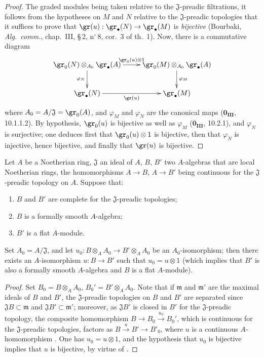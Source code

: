 \begin{proof}
The graded modules being taken relative to the $\mathfrak{J}$-preadic filtrations, it follows from the hypotheses on $M$ and $N$ relative to the $\mathfrak{J}$-preadic topologies that it suffices to prove that $\gr(u):\gr_\bullet(N)\to\gr_\bullet(M)$ is \emph{bijective} (Bourbaki, \emph{Alg.\ comm.}, chap.~III, \S\,2, n$^\circ$\,8, cor.~3 of th.~1).
Now, there is a commutative diagram
\[
\xymatrix{
  \gr_0(N)\otimes_{A_0}\gr_\bullet(A) \ar[r]^-{\gr_0(u)\otimes 1} \ar[d]_{\varphi_N} & \gr_0(M)\otimes_{A_0}\gr_\bullet(A) \ar[d]^{\varphi_M} \\
  \gr_\bullet(N) \ar[r]_-{\gr(u)} & \gr_\bullet(M)
}
\]
where $A_0=A/\mathfrak{J}=\gr_0(A)$, and $\varphi_M$ and $\varphi_N$ are the canonical maps ($\mathbf{0_{III}}$, 10.1.1.2).
By hypothesis, $\gr_0(u)$ is bijective as well as $\varphi_M$ ($\mathbf{0_{III}}$, 10.2.1), and $\varphi_N$ is surjective; one deduces first that $\gr_0(u)\otimes 1$ is bijective, then that $\varphi_N$ is injective, hence bijective, and finally that $\gr(u)$ is bijective.
\end{proof}

\begin{lemma}[19.7.1.5]
\label{0.19.7.1.5}
Let $A$ be a Noetherian ring, $\mathfrak{J}$ an ideal of $A$, $B$, $B'$ two $A$-algebras that are local Noetherian rings, the homomorphisms $A\to B$, $A\to B'$ being continuous for the $\mathfrak{J}$-preadic topology on $A$.
Suppose that:
\begin{enumerate}
  \item[$1^\circ$] $B$ and $B'$ are complete for the $\mathfrak{J}$-preadic topologies;
  \item[$2^\circ$] $B$ is a formally smooth $A$-algebra;
  \item[$3^\circ$] $B'$ is a flat $A$-module.
\end{enumerate}
Set $A_0=A/\mathfrak{J}$, and let $u_0:B\otimes_A A_0\to B'\otimes_A A_0$ be an $A_0$-isomorphism; then there exists an $A$-isomorphism $u:B\to B'$ such that $u_0=u\otimes 1$ (which implies that $B'$ is also a formally smooth $A$-algebra and $B$ is a flat $A$-module).
\end{lemma}

\begin{proof}
Set $B_0=B\otimes_A A_0$, $B_0'=B'\otimes_A A_0$.
Note that if $\mathfrak{m}$ and $\mathfrak{m}'$ are the maximal ideals of $B$ and $B'$, the $\mathfrak{J}$-preadic topologies on $B$ and $B'$ are separated since $\mathfrak{J}B\subset\mathfrak{m}$ and $\mathfrak{J}B'\subset\mathfrak{m}'$; moreover, as $\mathfrak{J}B'$ is closed in $B'$ for the $\mathfrak{J}$-preadic topology, the composite homomorphism $B\to B_0\xrightarrow{u_0}B_0'$, which is continuous for the $\mathfrak{J}$-preadic topologies, factors as $B\xrightarrow{u}B'\to B'_0$, where $u$ is a continuous $A$-homomorphism .
One has $u_0=u\otimes 1$, and the hypothesis that $u_0$ is bijective implies that $u$ is bijective, by virtue of .
\end{proof}

